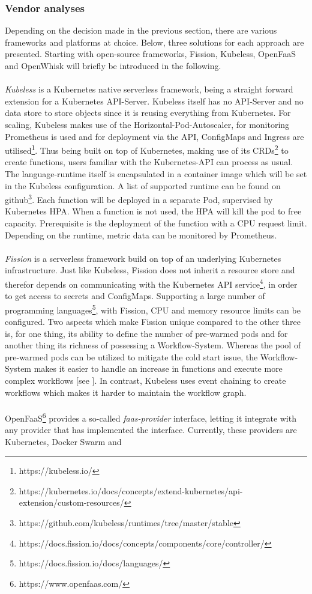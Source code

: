 \documentclass[11pt]{article}
\begin{document}
\subsubsection{Vendor analyses}
Depending on the decision made in the previous section, there are various frameworks and platforms at choice. Below, three solutions for each approach are presented. Starting with open-source frameworks, Fission, Kubeless, OpenFaaS and OpenWhisk will briefly be introduced in the following.\\\\ \textit{Kubeless} is a Kubernetes native serverless framework, being a straight forward extension for a Kubernetes API-Server. Kubeless itself has no API-Server and no data store to store objects since it is reusing everything from Kubernetes. For scaling, Kubeless makes use of the Horizontal-Pod-Autoscaler, for monitoring Prometheus is used and for deployment via the API, ConfigMaps and Ingress are utilised\footnote{https://kubeless.io/}. Thus being built on top of Kubernetes, making use of its CRDs\footnote{https://kubernetes.io/docs/concepts/extend-kubernetes/api-extension/custom-resources/} to create functions, users familiar with the Kubernetes-API can process as usual. The language-runtime itself is encapsulated in a container image which will be set in the Kubeless configuration. A list of supported runtime can be found on github\footnote{https://github.com/kubeless/runtimes/tree/master/stable}. Each function will be deployed in a separate Pod, supervised by Kubernetes HPA. When a function is not used, the HPA will kill the pod to free capacity. Prerequisite is the deployment of the function with a CPU request limit. Depending on the runtime, metric data can be monitored by Prometheus.\\\\ \textit{Fission} is a serverless framework build on top of an underlying Kubernetes infrastructure. Just like Kubeless, Fission does not inherit a resource store and therefor depends on communicating with the Kubernetes API service\footnote{https://docs.fission.io/docs/concepts/components/core/controller/}, in order to get access to secrets and \glqq ConfigMaps\grqq{}. Supporting a large number of programming languages\footnote{https://docs.fission.io/docs/languages/}, with Fission, CPU and memory resource limits can be configured. Two aspects which make Fission unique compared to the other three is, for one thing, its ability to define the number of pre-warmed pods and for another thing its richness of possessing a Workflow-System. Whereas the pool of pre-warmed pods can be utilized to mitigate the cold start issue, the Workflow-System makes it easier to handle an increase in functions and execute more complex workflows [see \cite{kritikos2018review}]. In contrast, Kubeless uses event chaining to create workflows which makes it harder to maintain the workflow graph.\\\\ OpenFaaS\footnote{https://www.openfaas.com/} provides a so-called \textit{faas-provider} interface, letting it integrate with any provider that has implemented the interface. Currently, these providers are Kubernetes, Docker Swarm and 
\end{document}
